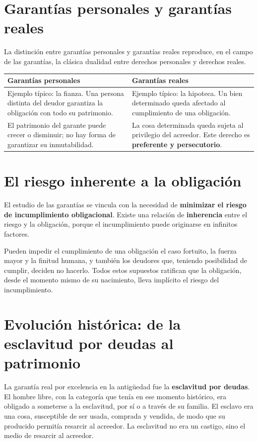 \documentclass[12pt,oneside]{book}
\begin{document}
\section{Garantías personales y garantías reales}

La distinción entre garantías personales y garantías reales reproduce, en el campo de las garantías, la clásica dualidad entre derechos personales y derechos reales.

\begin{table}[H]
\centering
\begin{tabularx}{\textwidth}{L L}
\toprule
\textbf{Garantías personales} & \textbf{Garantías reales} \\
\midrule
Ejemplo típico: la fianza. Una persona distinta del deudor garantiza la obligación con todo su patrimonio. &
Ejemplo típico: la hipoteca. Un bien determinado queda afectado al cumplimiento de una obligación. \\
\addlinespace
El patrimonio del garante puede crecer o disminuir; no hay forma de garantizar su inmutabilidad. &
La cosa determinada queda sujeta al privilegio del acreedor. Este derecho es \textbf{preferente y persecutorio}. \\
\bottomrule
\end{tabularx}
\end{table}

\section{El riesgo inherente a la obligación}

El estudio de las garantías se vincula con la necesidad de \textbf{minimizar el riesgo de incumplimiento obligacional}. Existe una relación de \textbf{inherencia} entre el riesgo y la obligación, porque el incumplimiento puede originarse en infinitos factores.

Pueden impedir el cumplimiento de una obligación el caso fortuito, la fuerza mayor y la finitud humana, y también los deudores que, teniendo posibilidad de cumplir, deciden no hacerlo. Todos estos supuestos ratifican que la obligación, desde el momento mismo de su nacimiento, lleva implícito el riesgo del incumplimiento.

\section{Evolución histórica: de la esclavitud por deudas al patrimonio}

La garantía real por excelencia en la antigüedad fue la \textbf{esclavitud por deudas}. El hombre libre, con la categoría que tenía en ese momento histórico, era obligado a someterse a la esclavitud, por sí o a través de su familia. El esclavo era una cosa, susceptible de ser usada, comprada y vendida, de modo que su producido permitía resarcir al acreedor. La esclavitud no era un castigo, sino el medio de resarcir al acreedor.
\end{document}
